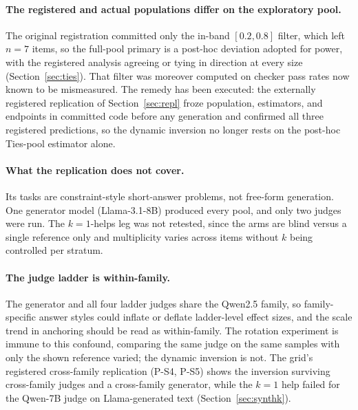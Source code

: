 \documentclass[11pt]{article}
\begin{document}
\paragraph{The registered and actual populations differ on the exploratory pool.}
The original registration committed only the in-band $[0.2, 0.8]$ filter, which left $n{=}7$ items, so the full-pool primary is a post-hoc deviation adopted for power, with the registered analysis agreeing or tying in direction at every size (Section~\ref{sec:ties}).
That filter was moreover computed on checker pass rates now known to be mismeasured.
The remedy has been executed: the externally registered replication of Section~\ref{sec:repl} froze population, estimators, and endpoints in committed code before any generation and confirmed all three registered predictions, so the dynamic inversion no longer rests on the post-hoc Ties-pool estimator alone.

\paragraph{What the replication does not cover.}
Its tasks are constraint-style short-answer problems, not free-form generation.
One generator model (Llama-3.1-8B) produced every pool, and only two judges were run.
The $k{=}1$-helps leg was not retested, since the arms are blind versus a single reference only and multiplicity varies across items without $k$ being controlled per stratum.

\paragraph{The judge ladder is within-family.}
The generator and all four ladder judges share the Qwen2.5 family, so family-specific answer styles could inflate or deflate ladder-level effect sizes, and the scale trend in anchoring should be read as within-family.
The rotation experiment is immune to this confound, comparing the same judge on the same samples with only the shown reference varied; the dynamic inversion is not.
The grid's registered cross-family replication (P-S4, P-S5) shows the inversion surviving cross-family judges and a cross-family generator, while the $k{=}1$ help failed for the Qwen-7B judge on Llama-generated text (Section~\ref{sec:synthk}).
\end{document}

